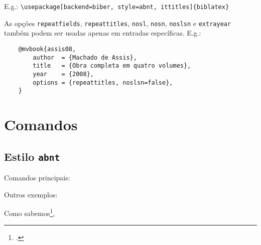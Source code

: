 \documentclass[a4paper]{article}
\begin{document}
\vspace{\baselineskip}
E.g.: \verb"\usepackage[backend=biber, style=abnt, ittitles]{biblatex}"

As opções \texttt{repeatfields}, \texttt{repeattitles}, \texttt{nosl},
\texttt{nosn}, \texttt{noslsn} e \texttt{extrayear} também podem ser usadas apenas em entradas
específicas. E.g.:

\begin{verbatim}
    @mvbook{assis08,
        author  = {Machado de Assis},
        title   = {Obra completa em quatro volumes},
        year    = {2008},
        options = {repeattitles, noslsn=false},
    }
\end{verbatim}


\section{Comandos}%
\label{sec:comandos}

\subsection{Estilo \texttt{abnt}}%

Comandos principais:

\begin{example}
\cite{amaral15}
\end{example}

\begin{example}
\textcite{bosi08}
\end{example}

\begin{example}
\end{example}

\begin{example}
\cites{moretti09}{mann09}{amaral15}
\end{example}

\begin{example}
\textcites{moretti09}{mann09}{amaral15}
\end{example}

Outros exemplos:

\begin{example}
Como sabemos\footcite[Cf.][]{assis08},
\end{example}

\begin{example}
\end{example}
\end{document}
